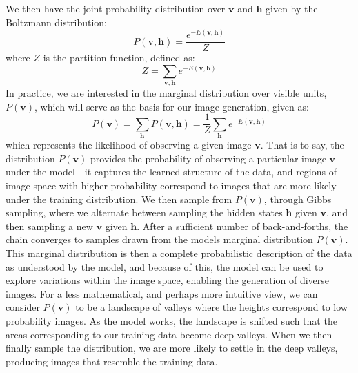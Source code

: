 \documentclass{article}
\begin{document}
We then have the joint probability distribution over $\mathbf{v}$ and $\mathbf{h}$ given by the Boltzmann distribution:
\begin{equation} \label{proba}
    P(\mathbf{v}, \mathbf{h}) = \frac{e^{-E(\mathbf{v}, \mathbf{h})}}{Z}
\end{equation}
where $Z$ is the partition function, defined as:
\begin{equation}
    Z = \sum_{\mathbf{v}, \mathbf{h}} e^{-E(\mathbf{v}, \mathbf{h})}
\end{equation}
In practice, we are interested in the marginal distribution over visible units, $P(\mathbf{v})$, which will serve as the basis for our image generation, given as:
\begin{equation}
    P(\mathbf{v}) = \sum_\mathbf{h} P(\mathbf{v}, \mathbf{h}) = \frac{1}{Z} \sum_\mathbf{h} e^{- E(\mathbf{v}, \mathbf{h})}
\end{equation}
which represents the likelihood of observing a given image $\mathbf{v}$. That is to say, the distribution $P(\mathbf{v})$ provides the probability of observing a particular image $\mathbf{v}$ under the model - it captures the learned structure of the data, and regions of image space with higher probability correspond to images that are more likely under the training distribution.\newline 
We then sample from $P(\mathbf{v})$, through Gibbs sampling, where we alternate between sampling the hidden states $\mathbf{h}$ given $\mathbf{v}$, and then sampling a new $\mathbf{v}$ given $\mathbf{h}$. After a sufficient number of back-and-forths, the chain converges to samples drawn from the models marginal distribution $P(\mathbf{v})$. \newline
This marginal distribution is then a complete probabilistic description of the data as understood by the model, and because of this, the model can be used to explore variations within the image space, enabling the generation of diverse images.
\newline
For a less mathematical, and perhaps more intuitive view, we can consider $P(\mathbf{v})$ to be a landscape of valleys where the heights correspond to low probability images. As the model works, the landscape is shifted such that the areas corresponding to our training data become deep valleys. When we then finally sample the distribution, we are more likely to settle in the deep valleys, producing images that resemble the training data.
\end{document}
